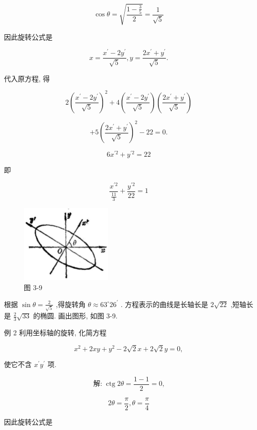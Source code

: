 \documentclass[lang=cn,newtx,10pt,scheme=chinese]{elegantbook}
\begin{document}
\[
  \cos \theta = \sqrt{\frac{1 - \frac{3}{5}}{2}} = \frac{1}{\sqrt{5}}
\]

因此旋转公式是

\[
  x = \frac{{x}^{\prime } - 2{y}^{\prime }}{\sqrt{5}},y = \frac{2{x}^{\prime } + {y}^{\prime }}{\sqrt{5}}.
\]

代入原方程, 得

\[
  2{\left( \frac{{x}^{\prime } - 2{y}^{\prime }}{\sqrt{5}}\right) }^{2} + 4\left( \frac{{x}^{\prime } - 2{y}^{\prime }}{\sqrt{5}}\right) \left( \frac{2{x}^{\prime } + {y}^{\prime }}{\sqrt{5}}\right)
\]

\[
  + 5{\left( \frac{2{x}^{\prime } + {y}^{\prime }}{\sqrt{5}}\right) }^{2} - {22} = 0.
\]

\[
  6{x}^{\prime 2} + {y}^{\prime 2} = {22}
\]

即

\[
  \frac{{x}^{\prime 2}}{\frac{11}{3}} + \frac{{y}^{\prime 2}}{22} = 1
\]

\begin{figure}[h]
  \centering
  \includegraphics[max width=0.4\textwidth]{images/01912cc2-ffb6-728e-9ae7-b113ff05c64b_146_713854.jpg}
  \caption{图 3-9}
\end{figure}



根据 \(\sin \theta = \frac{2}{\sqrt{5}}\) ,得旋转角 \(\theta \approx {63}^{ \circ }{26}^{\prime }\) . 方程表示的曲线是长轴长是 \(2\sqrt{22}\) ,短轴长是 \(\frac{2}{3}\sqrt{33}\) 的椭圆. 画出图形, 如图 3-9.

例 2 利用坐标轴的旋转, 化简方程

\[
    {x}^{2} + {2xy} + {y}^{2} - 2\sqrt{2}x + 2\sqrt{2}y = 0,
\]

使它不含 \({x}^{\prime }{y}^{\prime }\) 项.

\[
  \text{解:}\;\operatorname{ctg}{2\theta } = \frac{1 - 1}{2} = 0\text{,}
\]

\[
    {2\theta } = \frac{\pi }{2},\theta = \frac{\pi }{4}
\]

因此旋转公式是
\end{document}
